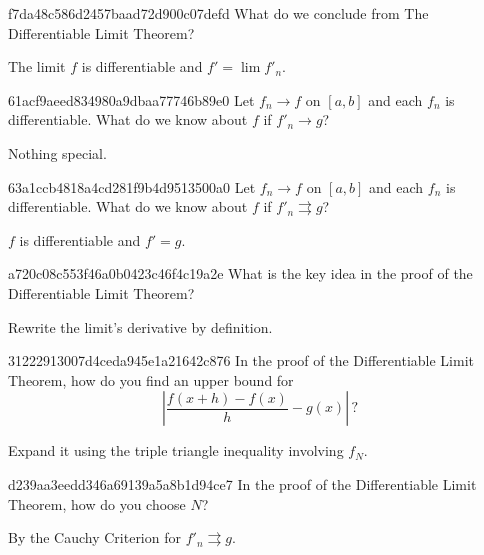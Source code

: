 \begin{note}{f7da48c586d2457baad72d900c07defd}
    What do we conclude from The Differentiable Limit Theorem?

    \begin{cloze}{1}
        The limit \({ f }\) is differentiable and \({ f' = \lim f'_n }\).
    \end{cloze}
\end{note}

\begin{note}{61acf9aeed834980a9dbaa77746b89e0}
    Let \({ f_n \to f }\) on \({ [a, b] }\) and each \({ f_n }\) is differentiable.
    What do we know about \({ f }\) if \({ f'_n \to g }\)?

    \begin{cloze}{1}
        Nothing special.
    \end{cloze}
\end{note}

\begin{note}{63a1ccb4818a4cd281f9b4d9513500a0}
    Let \({ f_n \to f }\) on \({ [a, b] }\) and each \({ f_n }\) is differentiable.
    What do we know about \({ f }\) if \({ f'_n \rightrightarrows g }\)?

    \begin{cloze}{1}
        \({ f }\) is differentiable and \({ f' = g }\).
    \end{cloze}
\end{note}

\begin{note}{a720c08c553f46a0b0423c46f4c19a2e}
    What is the key idea in the proof of the Differentiable Limit Theorem?

    \begin{cloze}{1}
        Rewrite the limit's derivative by definition.
    \end{cloze}
\end{note}

\begin{note}{31222913007d4ceda945e1a21642c876}
    In the proof of the Differentiable Limit Theorem, how do you find an upper bound for
    \[
        \left\lvert \frac{f(x + h) - f(x)}{h} - g(x) \right\rvert\,?
    \]

    \begin{cloze}{1}
        Expand it using the triple triangle inequality involving \({ f_N }\).
    \end{cloze}
\end{note}

\begin{note}{d239aa3eedd346a69139a5a8b1d94ce7}
    In the proof of the Differentiable Limit Theorem, how do you choose \({ N }\)?

    \begin{cloze}{1}
        By the Cauchy Criterion for \({ f'_n \rightrightarrows g }\).
    \end{cloze}
\end{note}

